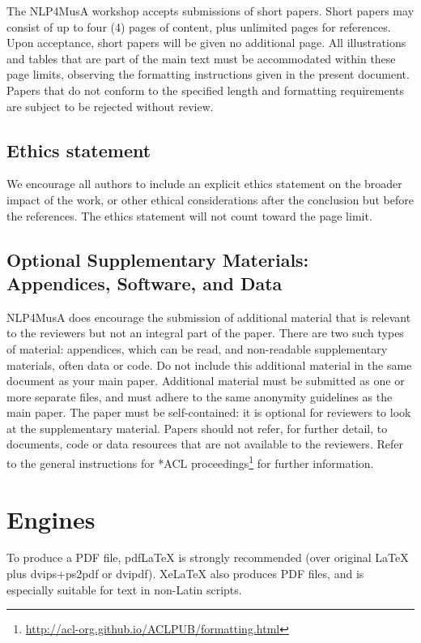 \documentclass[11pt]{article}
\begin{document}
The NLP4MusA workshop accepts submissions of short papers.
Short papers may consist of up to four (4) pages of content, plus unlimited pages for references.
Upon acceptance, short papers will be given no additional page.
All illustrations and tables that are part of the main text must be accommodated within these page limits, observing the formatting instructions given in the present document. 
Papers that do not conform to the specified length and formatting requirements are subject to be rejected without review.

\subsection{Ethics statement}
We encourage all authors to include an explicit ethics statement on the broader impact of the work, or other ethical considerations after the conclusion but before the references.
The ethics statement will not count toward the page limit.

\subsection{Optional Supplementary Materials: Appendices, Software, and Data}
NLP4MusA does encourage the submission of additional material that is relevant to the reviewers but not an integral part of the paper.
There are two such types of material: appendices, which can be read, and non-readable supplementary materials, often data or code.
Do not include this additional material in the same document as your main paper.
Additional material must be submitted as one or more separate files, and must adhere to the same anonymity guidelines as the main paper.
The paper must be self-contained: it is optional for reviewers to look at the supplementary material.
Papers should not refer, for further detail, to documents, code or data resources that are not available to the reviewers.
Refer to the general instructions for *ACL proceedings\footnote{\url{http://acl-org.github.io/ACLPUB/formatting.html}} for further information. 

\section{Engines}

To produce a PDF file, pdf\LaTeX{} is strongly recommended (over original \LaTeX{} plus dvips+ps2pdf or dvipdf). Xe\LaTeX{} also produces PDF files, and is especially suitable for text in non-Latin scripts.
\end{document}
